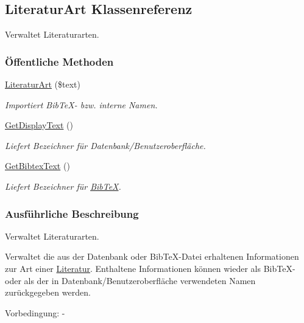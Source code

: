 \hypertarget{classLiteraturArt}{
\subsection{Literatur\-Art Klassenreferenz}
\label{classLiteraturArt}
}
Verwaltet Literaturarten.  


\subsubsection*{\"{O}ffentliche Methoden}
\begin{CompactItemize}
\item 
\hyperlink{classLiteraturArt_b3312217430531ed7821a46a39c49af7}{Literatur\-Art} (\$text)
\begin{CompactList}\small\item\em Importiert Bib\-Te\-X- bzw. interne Namen. \item\end{CompactList}\item 
\hyperlink{classLiteraturArt_43f747a6c5d840a22ddcd7e46d27cba0}{Get\-Display\-Text} ()
\begin{CompactList}\small\item\em Liefert Bezeichner für Datenbank/Benutzeroberfläche. \item\end{CompactList}\item 
\hyperlink{classLiteraturArt_01e1a2acd95df1ae0bb22e57b70a63de}{Get\-Bibtex\-Text} ()
\begin{CompactList}\small\item\em Liefert Bezeichner für \hyperlink{classBibTeX}{Bib\-Te\-X}. \item\end{CompactList}\end{CompactItemize}


\subsubsection{Ausf\"{u}hrliche Beschreibung}
Verwaltet Literaturarten. 

Verwaltet die aus der Datenbank oder Bib\-Te\-X-Datei erhaltenen Informationen zur Art einer \hyperlink{classLiteratur}{Literatur}. Enthaltene Informationen können wieder als Bib\-Te\-X- oder als der in Datenbank/Benutzeroberfläche verwendeten Namen zurückgegeben werden. \begin{Desc}
\item[Vorbedingung:]- \end{Desc}




